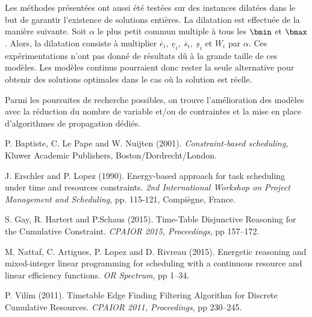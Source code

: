 Les méthodes présentées ont aussi été testées sur des instances
dilatées dans le but de garantir l'existence de solutions entières.  
La dilatation est effectuée de la manière suivante. Soit $\alpha$ le
plus petit commun 
multiple à tous les $\bmin$ et $\bmax$. Alors, la dilatation
consiste à multiplier $\overline{e}_i,\ \underline{e}_i,\
\overline{s}_i,\ \underline{s}_i$ et $W_i$ par $\alpha$. Ces
expérimentations n'ont pas donné de résultats dû à la grande taille
de ces modèles. Les modèles continus pourraient donc rester  la
seule alternative pour obtenir des solutions optimales dans le cas où
la solution est réelle.

Parmi les poursuites de recherche possibles, on trouve l'amélioration
des modèles avec la réduction du nombre de variable et/ou de contraintes et la
mise en place d'algorithmes de propagation dédiés.

\begin{thebibliography}{99}  
 P. Baptiste, C. Le Pape and W. Nuijten (2001).
\emph{Constraint-based scheduling}, Kluwer Academic Publishers,
Boston/Dordrecht/London.
  
 J. Erschler and P. Lopez (1990).  Energy-based
approach for task scheduling under time and resources constraints.
\emph{2nd International Workshop on Project Management and
Scheduling}, pp. 115-121, Compi{\`e}gne, France.
  
S. Gay, R. Hartert and P.Schaus (2015).
Time-Table Disjunctive Reasoning for the Cumulative Constraint.
\emph{CPAIOR 2015, Proceedings}, pp 157--172.

 M. Nattaf, C. Artigues, P. Lopez and D. Rivreau
(2015).  Energetic reasoning and mixed-integer linear programming for
scheduling with a continuous resource and linear efficiency functions.
\emph{OR Spectrum}, pp 1--34.

P. Vil{\'i}m (2011).
Timetable Edge Finding Filtering Algorithm for Discrete Cumulative Resources.
\emph{CPAIOR 2011, Proceedings}, pp 230--245.


\end{thebibliography}













